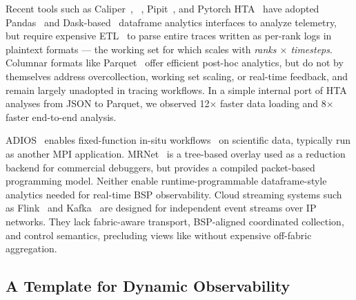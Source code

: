 Recent tools such as Caliper~\cite{Boehm2016:Caliper},
\dftracer{}~\cite{Devar2024:DFTracer}, Pipit~\cite{Bhate2024:Pipit}, and Pytorch
HTA~\cite{2025:MetaHTA} have adopted Pandas~\cite{:Pandas} and Dask-based~\cite{Rockl2015:Dask}
dataframe analytics interfaces to analyze telemetry, but require expensive
ETL~\cite{Yildi2023:IOMax} to parse entire traces written as per-rank logs in
plaintext formats
--- the working set for which scales with \emph{ranks $\times$ timesteps}.
Columnar formats like Parquet~\cite{:ApacheParquet} offer efficient post-hoc analytics, but do not
by themselves address overcollection, working set scaling, or real-time feedback, and remain
largely unadopted in tracing workflows.
In a simple internal port of HTA analyses from JSON to Parquet, we observed 12$\times$ faster data
loading
and 8$\times$ faster end-to-end analysis.

ADIOS~\cite{Godoy2020:ADIOS2} enables fixed-function in-situ
workflows~\cite{Eisen2025:ADIOS} on scientific data, typically run as another MPI application.
MRNet~\cite{Roth2003:MRNet,Willi2016:MRNetApps} is a tree-based overlay used as a reduction backend
for commercial debuggers, but provides a compiled packet-based programming model.
Neither enable runtime-programmable dataframe-style analytics needed for real-time BSP
observability.
Cloud streaming systems such as Flink~\cite{Carbo2015:ApacheFlink} and Kafka~\cite{Kreps2011:Kafka}
are designed for independent event streams over IP networks.
They lack fabric-aware transport, BSP-aligned coordinated collection, and control semantics,
precluding views like  without expensive off-fabric aggregation.

\subsection{A Template for Dynamic Observability}\label{sec:orca:bg:template}


